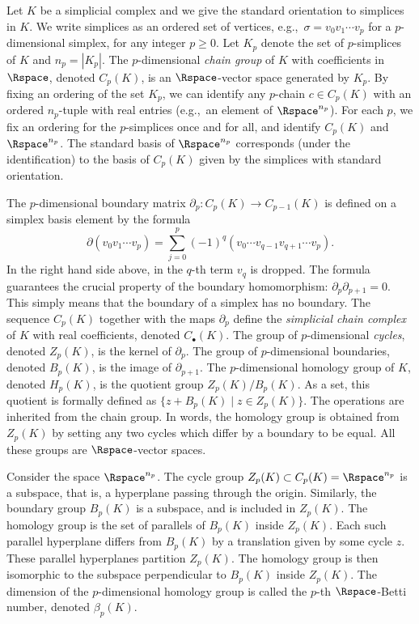 Let $K$ be a simplicial complex and we give the standard orientation to simplices in $K$. We write simplices as an ordered set of vertices, e.g.,~$\sigma=v_0v_1\cdots v_{p}$ for a $p$-dimensional simplex, for any integer $p \geq 0$.
Let $K_p$ denote the set of $p$-simplices of $K$ and $n_p=|K_p|$. 
The $p$-dimensional \emph{chain group} of $K$ with coefficients in $\Rspace$, denoted $C_p(K)$, is an $\Rspace$-vector space generated by $K_p$. 
By fixing an ordering of the set $K_p$, we can identify any $p$-chain $c\in C_p(K)$ with an ordered $n_p$-tuple with real entries (e.g.,~an element of $\Rspace^{n_p}$).
For each $p$, we fix an ordering for the $p$-simplices once and for all, and identify $C_p(K)$ and $\Rspace^{n_p}$. 
The standard basis of $\Rspace^{n_p}$ corresponds (under the identification) to the basis of $C_p(K)$ given by the simplices with standard orientation.

The $p$-dimensional boundary matrix $\partial_p: C_p(K) \rightarrow C_{p-1}(K)$ is defined on a simplex basis element by the formula
\[ \partial (v_0v_1 \cdots v_p)= \sum_{j=0}^{p} {(-1)^q (v_0\cdots v_{q-1}v_{q+1}\cdots v_p) }.\]
In the right hand side above, in the $q$-th term $v_q$ is dropped. The formula guarantees the crucial property of the boundary homomorphism: $\partial_{p} \partial_{p+1} = 0$. This simply means that the boundary of a simplex has no boundary. The sequence $C_p(K)$ together with the maps $\partial_p$ define the \textit{simplicial chain complex} of $K$ with real coefficients, denoted $C_{\bullet}(K)$. The group of $p$-dimensional \textit{cycles}, denoted $Z_p(K)$, is the kernel of $\partial_p$. The group of $p$-dimensional boundaries, denoted $B_p(K)$, is the image of $\partial_{p+1}$. The $p$-dimensional homology group of $K$, denoted $H_p(K)$, is the quotient group $Z_p(K)/B_p(K)$. 
As a set, this quotient is formally defined as $\{z+B_p(K) \mid  z\in Z_p(K)\}$. The operations are inherited from the chain group. In words, the homology group is obtained from $Z_p(K)$ by setting any two cycles which differ by a boundary to be equal. All these groups are $\Rspace$-vector spaces.

Consider the space $\Rspace^{n_p}$. The cycle group $Z_p(K) \subset C_p(K) = \Rspace^{n_p}$ is a subspace, that is, a hyperplane passing through the origin. Similarly, the boundary group $B_p(K)$ is a subspace, and is included in $Z_p(K)$. The homology group is the set of parallels of $B_p(K)$ inside $Z_p(K)$. Each such parallel hyperplane differs from $B_p(K)$ by a translation given by some cycle $z$. These parallel hyperplanes partition $Z_p(K)$. The homology group is then isomorphic to the subspace perpendicular to $B_p(K)$ inside $Z_p(K)$. 
The dimension of the $p$-dimensional homology group is called the $p$-th $\Rspace$-Betti number, denoted $\beta_p(K)$. 

